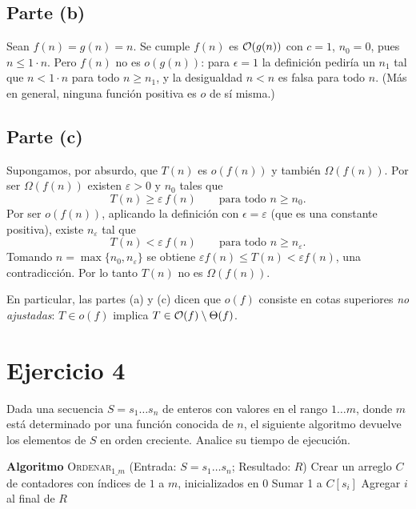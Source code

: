 \subsection*{Parte (b)}
Sean $f(n)=g(n)=n$. Se cumple $f(n)$ es $\mathcal{O}(g(n))$ con $c=1$, $n_0=0$, pues $n\le 1\cdot n$.
Pero $f(n)$ no es $o(g(n))$: para $\epsilon=1$ la definición pediría un $n_1$ tal que
$n<1\cdot n$ para todo $n\ge n_1$, y la desigualdad $n<n$ es falsa para todo $n$. (Más en
general, ninguna función positiva es $o$ de sí misma.)

\subsection*{Parte (c)}
Supongamos, por absurdo, que $T(n)$ es $o(f(n))$ y también $\Omega(f(n))$. Por ser
$\Omega(f(n))$ existen $\varepsilon>0$ y $n_0$ tales que
\[
T(n)\ge \varepsilon\, f(n)\qquad \text{para todo } n\ge n_0 .
\]
Por ser $o(f(n))$, aplicando la definición con $\epsilon=\varepsilon$ (que es una constante
positiva), existe $n_\varepsilon$ tal que
\[
T(n)< \varepsilon\, f(n)\qquad \text{para todo } n\ge n_\varepsilon .
\]
Tomando $n=\max\{n_0,n_\varepsilon\}$ se obtiene $\varepsilon f(n)\le T(n)<\varepsilon f(n)$,
una contradicción. Por lo tanto $T(n)$ no es $\Omega(f(n))$.

En particular, las partes (a) y (c) dicen que $o(f)$ consiste en cotas superiores \emph{no
ajustadas}: $T\in o(f)$ implica $T\in \mathcal{O}(f)\setminus \Theta(f)$.

\section{Ejercicio 4}

\begin{enunciado}
Dada una secuencia $S=s_1\dots s_n$ de enteros con valores en el rango $1\dots m$, donde $m$
está determinado por una función conocida de $n$, el siguiente algoritmo devuelve los elementos
de $S$ en orden creciente. Analice su tiempo de ejecución.
\begin{algorithmic}
\Statex \textbf{Algoritmo} \textsc{Ordenar}$_{1\_m}$ \quad (Entrada: $S=s_1\dots s_n$; Resultado: $R$)
\State Crear un arreglo $C$ de contadores con índices de $1$ a $m$, inicializados en $0$
  \State Sumar 1 a $C[s_i]$
\EndFor
{}
    \State Agregar $i$ al final de $R$
  \EndFor
\EndFor
\end{algorithmic}
\end{enunciado}

